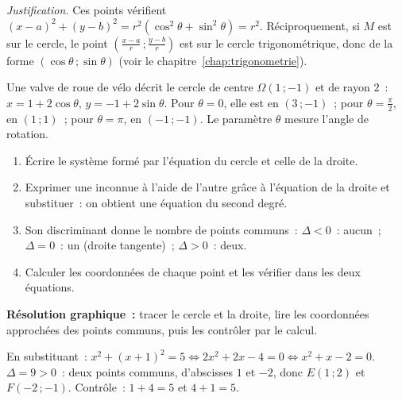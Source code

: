 \noindent\textit{Justification.} Ces points v\'erifient
$(x-a)^2+(y-b)^2=r^2(\cos^2\theta+\sin^2\theta)=r^2$. R\'eciproquement, si $M$ est
sur le cercle, le point $\left(\frac{x-a}{r}\,;\frac{y-b}{r}\right)$ est sur le
cercle trigonom\'etrique, donc de la forme $(\cos\theta\,;\sin\theta)$
(voir le chapitre~\ref{chap:trigonometrie}).

\begin{ex}
Une valve de roue de v\'elo d\'ecrit le cercle de centre $\Omega(1\,;-1)$ et de
rayon $2$~: $x=1+2\cos\theta$, $y=-1+2\sin\theta$.
Pour $\theta=0$, elle est en $(3\,;-1)$~; pour $\theta=\frac{\pi}{2}$, en $(1\,;1)$~;
pour $\theta=\pi$, en $(-1\,;-1)$. Le param\`etre $\theta$ mesure l'angle de rotation.
\end{ex}

\begin{methode}
\begin{enumerate}
  \item \'Ecrire le syst\`eme form\'e par l'\'equation du cercle et celle de la droite.
  \item Exprimer une inconnue \`a l'aide de l'autre gr\^ace \`a l'\'equation de la
        droite et substituer~: on obtient une \'equation du second degr\'e.
  \item Son discriminant donne le nombre de points communs~:
        $\Delta<0$~: aucun~; $\Delta=0$~: un (droite tangente)~; $\Delta>0$~: deux.
  \item Calculer les coordonn\'ees de chaque point et les v\'erifier dans les deux \'equations.
\end{enumerate}
\textbf{R\'esolution graphique~:} tracer le cercle et la droite, lire les
coordonn\'ees approch\'ees des points communs, puis les contr\^oler par le calcul.
\end{methode}

\begin{ex}[$\mathcal C$~: $x^2+y^2=5$ et $D$~: $y=x+1$]
En substituant~: $x^2+(x+1)^2=5\Leftrightarrow2x^2+2x-4=0\Leftrightarrow x^2+x-2=0$.
$\Delta=9>0$~: deux points communs, d'abscisses $1$ et $-2$, donc
$E(1\,;2)$ et $F(-2\,;-1)$. Contr\^ole~: $1+4=5$ et $4+1=5$.
\begin{center}
\end{center}
\end{ex}

